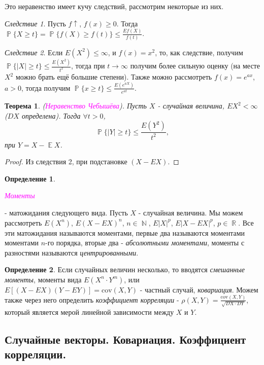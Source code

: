 \documentclass[a4paper,100pt]{article}
\theoremstyle{indented}
\newtheorem{theorem}{Теорема}
\theoremstyle{definition}
\newtheorem{defn}{Определение}
\theoremstyle{remark}
\newtheorem{cons}{Следствие}
\DeclareMathOperator{\RR}{\mathbb{R}}
\DeclareMathOperator{\NN}{\mathbb{N}}
\DeclareMathOperator{\PP}{\mathbb{P}}
\DeclareMathOperator{\EE}{\mathbb{E}}
\begin{document}
Это неравенство имеет кучу следствий, рассмотрим некоторые из них.

\begin{cons}
  Пусть $f\uparrow$, $f(x)\geq 0$. Тогда $\PP\{X\geq t\}=\PP\{f(X)\geq f(t)\}\leq \frac{Ef(X)}{f(t)}$. 
\end{cons}

\begin{cons}
  Если $E(X^2)\leq \infty$, и $f(x)=x^2$, то, как следствие, получим $\PP\{|X|\geq t\}\leq \frac{E(X^2)}{t^2}$, тогда при $t\rightarrow \infty$ получим более сильную оценку (на месте $X^2$ можно брать ещё большие степени). Также можно рассмотреть $f(x)=e^{ax}$, $a>0$, тогда получим $\PP\{x\geq t\}\leq \frac{E(e^{aX})}{e^{at}}$. 
\end{cons}

\begin{theorem}
  (\hypertarget{n16}{\textcolor{magenta}{\textit{Неравенство Чебышёва}}}). Пусть $X$ - случайная величина, $EX^2<\infty$ ($DX$ определена). Тогда $\forall t >0$, 
  \[
      \PP\{|Y|\geq t\}\leq \frac{E(Y^2)}{t^2},
  \]
  при $Y=X-\EE X$.
\end{theorem}

\begin{proof}
  Из следствия 2, при подстановке $(X-EX)$. 
\end{proof}

\begin{defn}
  \hypertarget{n17}{\textcolor{magenta}{\textit{Моменты}}} - матожидания следующего вида. Пусть $X$ - случайная величина. Мы можем рассмотреть $E(X^n)$, $E(X-EX)^n$, $n\in \NN$, $E|X|^p$, $E|X-EX|^p$, $p\in \RR$. Все эти матожидания называются моментами, первые два называются моментами моментами $n$-го порядка, вторые два - \textit{абсолютными моментами}, моменты с разностями называются \textit{центрированными}.  
\end{defn}

\begin{defn}
  Если случайных величин несколько, то вводятся \textit{смешанные моменты}, моменты вида $E(X^n\cdot Y^m)$, или $E[(X-EX)(Y-EY)]=\text{cov}(X, Y)$ - частный случай, \textit{ковариация}. Можем также через него определить \textit{коэффициент корреляции} - $\rho(X, Y)=\frac{\text{cov}(X, Y)}{\sqrt{DX\cdot DY}}$, который является мерой линейной зависимости между $X$ и $Y$. 
\end{defn}

\subsection{Случайные векторы. Ковариация. Коэффициент корреляции.} 
\end{document}
